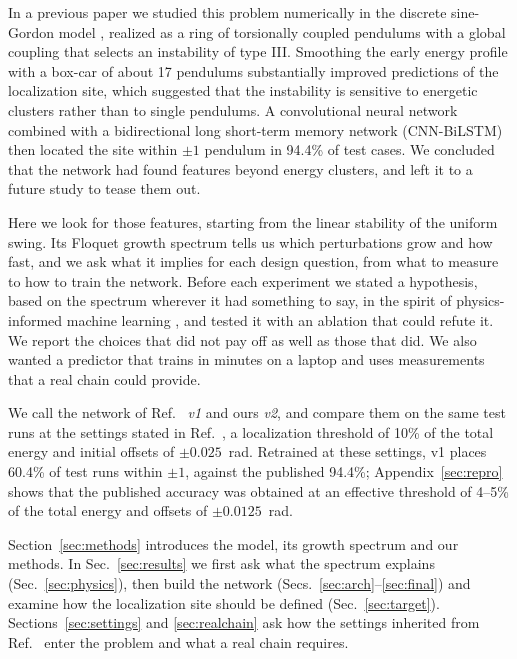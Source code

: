 \documentclass[11pt]{article}
\begin{document}
In a previous paper \cite{mittal2026jand} we studied this problem numerically in the discrete sine-Gordon model \cite{cuevas2014sine}, realized as a ring of torsionally coupled pendulums with a global coupling that selects an instability of type III. Smoothing the early energy profile with a box-car of about 17 pendulums substantially improved predictions of the localization site, which suggested that the instability is sensitive to energetic clusters rather than to single pendulums. A convolutional neural network combined with a bidirectional long short-term memory network \cite{Hochreiter1997} (CNN-BiLSTM) then located the site within $\pm1$ pendulum in 94.4\% of test cases. We concluded that the network had found features beyond energy clusters, and left it to a future study to tease them out.

Here we look for those features, starting from the linear stability of the uniform swing. Its Floquet growth spectrum tells us which perturbations grow and how fast, and we ask what it implies for each design question, from what to measure to how to train the network. Before each experiment we stated a hypothesis, based on the spectrum wherever it had something to say, in the spirit of physics-informed machine learning \cite{karniadakis2021physics}, and tested it with an ablation that could refute it. We report the choices that did not pay off as well as those that did. We also wanted a predictor that trains in minutes on a laptop and uses measurements that a real chain could provide.

We call the network of Ref.~\cite{mittal2026jand} \emph{v1} and ours \emph{v2}, and compare them on the same test runs at the settings stated in Ref.~\cite{mittal2026jand}, a localization threshold of 10\% of the total energy and initial offsets of $\pm0.025$~rad. Retrained at these settings, v1 places 60.4\% of test runs within $\pm1$, against the published 94.4\%; Appendix~\ref{sec:repro} shows that the published accuracy was obtained at an effective threshold of 4--5\% of the total energy and offsets of $\pm0.0125$~rad.

Section~\ref{sec:methods} introduces the model, its growth spectrum and our methods. In Sec.~\ref{sec:results} we first ask what the spectrum explains (Sec.~\ref{sec:physics}), then build the network (Secs.~\ref{sec:arch}--\ref{sec:final}) and examine how the localization site should be defined (Sec.~\ref{sec:target}). Sections~\ref{sec:settings} and \ref{sec:realchain} ask how the settings inherited from Ref.~\cite{mittal2026jand} enter the problem and what a real chain requires.
\end{document}
